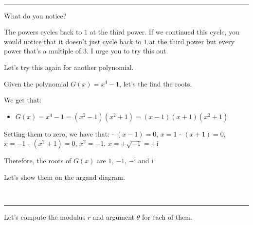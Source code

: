 \documentclass[11pt]{article}
\providecommand{\tightlist}{%
      \setlength{\itemsep}{0pt}\setlength{\parskip}{0pt}}
\begin{document}
    \begin{center}
    \end{center}
    { \hspace*{\fill} \\}
    
    \begin{center}\rule{0.5\linewidth}{0.5pt}\end{center}

    What do you notice?

The powers cycles back to \(1\) at the third power. If we continued this
cycle, you would notice that it doesn't just cycle back to \(1\) at the
third power but every power that's a multiple of \(3\). I urge you to
try this out.

Let's try this again for another polynomial.

Given the polynomial \(G(x) = x^4 - 1\), let's the find the roots.

We get that:

\begin{itemize}
\tightlist
\item
  \(G(x) = x^4 - 1 = (x^2 - 1)(x^2 + 1) = (x - 1)(x + 1)(x^2 + 1)\)
\end{itemize}

Setting them to zero, we have that: - \((x - 1) = 0\), \(x = 1\) -
\((x + 1) = 0\), \(x = -1\) - \((x^2 + 1) = 0\), \(x^2 = -1\),
\(x = \pm\sqrt{-1} = \pm\mathrm{i}\)

Therefore, the roots of \(G(x)\) are \(1\), \(-1\), \(-\mathrm{i}\) and
\(\mathrm{i}\)

Let's show them on the argand diagram.

    \begin{center}
    \end{center}
    { \hspace*{\fill} \\}
    
    \begin{center}\rule{0.5\linewidth}{0.5pt}\end{center}

    Let's compute the modulus \(r\) and argument \(\theta\) for each of
them.
\end{document}
